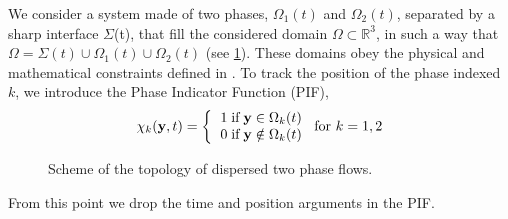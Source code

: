 
\label{sec:two-fluid}

We consider a system made of two phases, $\Omega_1(t)$ and $\Omega_2(t)$, separated by a sharp interface $\Sigma$(t), that fill the considered domain $\Omega \subset \mathbb{R}^3$, in such a way that $\Omega = \Sigma(t) \cup \Omega_1(t) \cup \Omega_2(t)$ (see \ref{fig:Scheme}). 
These domains obey the physical and mathematical constraints defined in \cite{bothe2022sharp}. 
To track the position of the phase indexed $k$, we introduce the Phase Indicator Function (PIF), 
\begin{equation}
    \chi_k(\textbf{y},t) =  \left\{
      \begin{tabular}{cc}
        $1 \;\text{if} \;\textbf{y} \in \Omega_k(t)$\\
        $0 \;\text{if} \;\textbf{y} \notin \Omega_k(t)$
      \end{tabular}
      \right.
      \text{for $k = 1,2$}
      \label{eq:PIF}
\end{equation}
\begin{figure}[h!]
    \centering
    \caption{Scheme of the topology of dispersed two phase flows.}
    \label{fig:Scheme}
\end{figure}
From this point we drop the time and position arguments in the PIF. 

